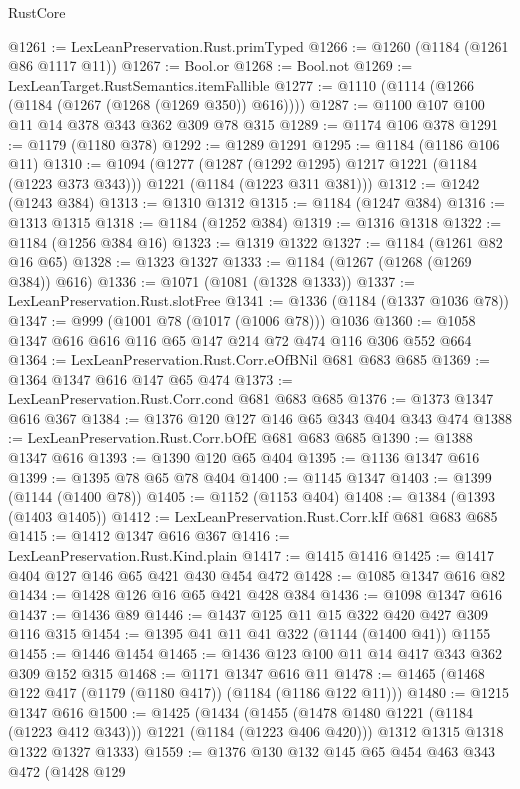 \begin{lexlean}{RustCore}
\begin{coremodule}
@1261 := LexLeanPreservation.Rust.primTyped
@1266 := @1260 (@1184 (@1261 @86 @1117 @11))
@1267 := Bool.or
@1268 := Bool.not
@1269 := LexLeanTarget.RustSemantics.itemFallible
@1277 := @1110 (@1114 (@1266 (@1184 (@1267 (@1268 (@1269 @350)) @616))))
@1287 := @1100 @107 @100 @11 @14 @378 @343 @362 @309 @78 @315
@1289 := @1174 @106 @378
@1291 := @1179 (@1180 @378)
@1292 := @1289 @1291
@1295 := @1184 (@1186 @106 @11)
@1310 := @1094
    (@1277
      (@1287 (@1292 @1295) @1217 @1221 (@1184 (@1223 @373 @343)))
      @1221
      (@1184 (@1223 @311 @381)))
@1312 := @1242 (@1243 @384)
@1313 := @1310 @1312
@1315 := @1184 (@1247 @384)
@1316 := @1313 @1315
@1318 := @1184 (@1252 @384)
@1319 := @1316 @1318
@1322 := @1184 (@1256 @384 @16)
@1323 := @1319 @1322
@1327 := @1184 (@1261 @82 @16 @65)
@1328 := @1323 @1327
@1333 := @1184 (@1267 (@1268 (@1269 @384)) @616)
@1336 := @1071 (@1081 (@1328 @1333))
@1337 := LexLeanPreservation.Rust.slotFree
@1341 := @1336 (@1184 (@1337 @1036 @78))
@1347 := @999 (@1001 @78 (@1017 (@1006 @78))) @1036
@1360 := @1058 @1347 @616 @616 @116 @65 @147 @214 @72 @474 @116 @306 @552 @664
@1364 := LexLeanPreservation.Rust.Corr.eOfBNil @681 @683 @685
@1369 := @1364 @1347 @616 @147 @65 @474
@1373 := LexLeanPreservation.Rust.Corr.cond @681 @683 @685
@1376 := @1373 @1347 @616 @367
@1384 := @1376 @120 @127 @146 @65 @343 @404 @343 @474
@1388 := LexLeanPreservation.Rust.Corr.bOfE @681 @683 @685
@1390 := @1388 @1347 @616
@1393 := @1390 @120 @65 @404
@1395 := @1136 @1347 @616
@1399 := @1395 @78 @65 @78 @404
@1400 := @1145 @1347
@1403 := @1399 (@1144 (@1400 @78))
@1405 := @1152 (@1153 @404)
@1408 := @1384 (@1393 (@1403 @1405))
@1412 := LexLeanPreservation.Rust.Corr.kIf @681 @683 @685
@1415 := @1412 @1347 @616 @367
@1416 := LexLeanPreservation.Rust.Kind.plain
@1417 := @1415 @1416
@1425 := @1417 @404 @127 @146 @65 @421 @430 @454 @472
@1428 := @1085 @1347 @616 @82
@1434 := @1428 @126 @16 @65 @421 @428 @384
@1436 := @1098 @1347 @616
@1437 := @1436 @89
@1446 := @1437 @125 @11 @15 @322 @420 @427 @309 @116 @315
@1454 := @1395 @41 @11 @41 @322 (@1144 (@1400 @41)) @1155
@1455 := @1446 @1454
@1465 := @1436 @123 @100 @11 @14 @417 @343 @362 @309 @152 @315
@1468 := @1171 @1347 @616 @11
@1478 := @1465 (@1468 @122 @417 (@1179 (@1180 @417)) (@1184 (@1186 @122 @11)))
@1480 := @1215 @1347 @616
@1500 := @1425
    (@1434
      (@1455 (@1478 @1480 @1221 (@1184 (@1223 @412 @343))) @1221 (@1184 (@1223 @406 @420)))
      @1312
      @1315
      @1318
      @1322
      @1327
      @1333)
@1559 := @1376
    @130
    @132
    @145
    @65
    @454
    @463
    @343
    @472
    (@1428
      @129

\end{coremodule}
\end{lexlean}
